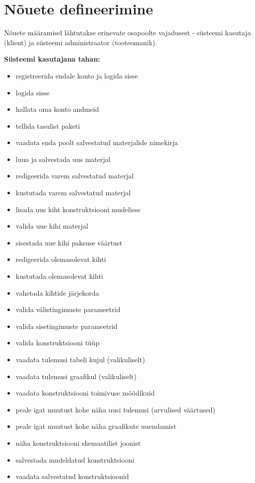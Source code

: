 \section{Nõuete defineerimine}
Nõuete määramisel lähtutakse erinevate osapoolte vajadusest - süsteemi kasutaja (klient) ja süsteemi administraator (tooteomanik).


\textbf{Süsteemi kasutajana tahan:}
\begin{itemize}
    \item registreerida endale konto ja logida sisse
    \item logida sisse
    \item hallata oma konto andmeid
    \item tellida tasulist paketi
    \item vaadata enda poolt salvestatud materjalide nimekirja
    \item luua ja salvestada uus materjal
    \item redigeerida varem salvestatud materjal
    \item kustutada varem salvestatud materjal
    \item lisada uus kiht konstruktsiooni mudelisse
    \item valida uue kihi materjal
    \item sisestada uue kihi paksuse väärtust
    \item redigeerida olemasolevat kihti
    \item kustutada olemasolevat kihti
    \item vahetada kihtide järjekorda
    \item valida välistingimuste parameetrid
    \item valida sisetingimuste parameetrid
    \item valida konstruktsiooni tüüp
    \item vaadata tulemusi tabeli kujul (valikuliselt)
    \item vaadata tulemusi graafikul (valikuliselt)
    \item vaadata konstruktsiooni toimivuse mõõdikuid
    \item peale igat muutust kohe näha uusi tulemusi (arvulised väärtused)
    \item peale igat muutust kohe näha graafikute uuendamist
    \item näha konstruktsiooni skemaatilist joonist
    \item salvestada mudeldatud konstruktsiooni
    \item vaadata salvestatud konstruktsioonid

\end{itemize}
